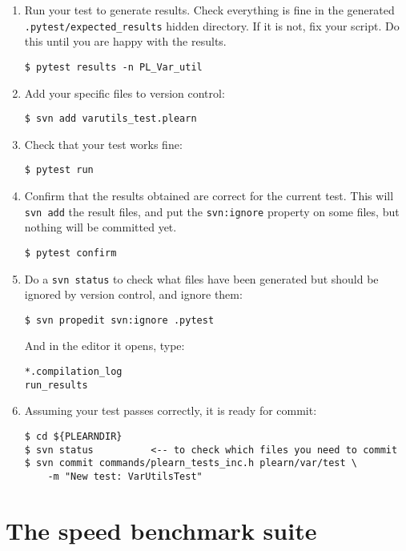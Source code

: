 \documentclass[11pt]{book}
\begin{document}
\begin{enumerate}
  \item Run your test to generate results. Check everything is fine in
  the generated {\tt .pytest/expected\_results} hidden directory. If it
  is not, fix your script. Do this until you are happy with the results.
\begin{verbatim}
$ pytest results -n PL_Var_util
\end{verbatim}

  \item Add your specific files to version control:
\begin{verbatim}
$ svn add varutils_test.plearn
\end{verbatim}

  \item \label{run} Check that your test works fine:
\begin{verbatim}
$ pytest run
\end{verbatim}

  \item \label{confirm} Confirm that the results obtained are correct
  for the current test. This will {\tt svn add} the result files, and
  put the {\tt svn:ignore} property on some files, but nothing will be
  committed yet.
\begin{verbatim}
$ pytest confirm
\end{verbatim}

  \item Do a {\tt svn status} to check what files have been generated
  but should be ignored by version control, and ignore them:
\begin{verbatim}
$ svn propedit svn:ignore .pytest
\end{verbatim}
  And in the editor it opens, type:
\begin{verbatim}
*.compilation_log
run_results
\end{verbatim}

  \item Assuming your test passes correctly, it is ready for commit:
\begin{verbatim}
$ cd ${PLEARNDIR}
$ svn status          <-- to check which files you need to commit
$ svn commit commands/plearn_tests_inc.h plearn/var/test \
    -m "New test: VarUtilsTest"
\end{verbatim}
\end{enumerate}


\chapter{The speed benchmark suite}
\end{document}

